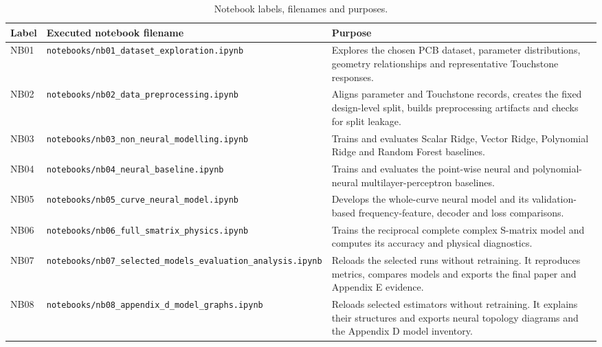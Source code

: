 \begin{table}[!htbp]
    \caption{Notebook labels, filenames and purposes.}
    \label{tab:appendix-f-nbs}
    \centering
    \scriptsize
    \begin{tabular}{@{}p{}p{}
                         p{}@{}}
        \toprule
        Label & Executed notebook filename & Purpose \\
        \midrule
        NB01
          & \nolinkurl{notebooks/nb01_dataset_exploration.ipynb}
          & Explores the chosen PCB dataset, parameter distributions, geometry
            relationships and representative Touchstone responses. \\
        NB02
          & \nolinkurl{notebooks/nb02_data_preprocessing.ipynb}
          & Aligns parameter and Touchstone records, creates the fixed
            design-level split, builds preprocessing artifacts and checks for
            split leakage. \\
        NB03
          & \nolinkurl{notebooks/nb03_non_neural_modelling.ipynb}
          & Trains and evaluates Scalar Ridge, Vector Ridge, Polynomial Ridge
            and Random Forest baselines. \\
        NB04
          & \nolinkurl{notebooks/nb04_neural_baseline.ipynb}
          & Trains and evaluates the point-wise neural and polynomial-neural
            multilayer-perceptron baselines. \\
        NB05
          & \nolinkurl{notebooks/nb05_curve_neural_model.ipynb}
          & Develops the whole-curve neural model and its validation-based
            frequency-feature, decoder and loss comparisons. \\
        NB06
          & \nolinkurl{notebooks/nb06_full_smatrix_physics.ipynb}
          & Trains the reciprocal complete complex S-matrix model and computes
            its accuracy and physical diagnostics. \\
        NB07
          & \nolinkurl{notebooks/nb07_selected_models_evaluation_analysis.ipynb}
          & Reloads the selected runs without retraining. It reproduces metrics,
            compares models and exports the final paper and Appendix E evidence.
            \\
        NB08
          & \nolinkurl{notebooks/nb08_appendix_d_model_graphs.ipynb}
          & Reloads selected estimators without retraining. It explains their
            structures and exports neural topology diagrams and the Appendix D
            model inventory. \\
        \bottomrule
    \end{tabular}
\end{table}


